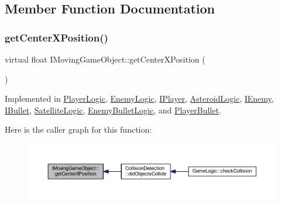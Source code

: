 \subsection{Member Function Documentation}
\mbox{\label{class_i_moving_game_object_ae4e6c21094ef1e2db32729270c8a7999}} 
\subsubsection{\texorpdfstring{get\+Center\+X\+Position()}{getCenterXPosition()}}
{\footnotesize\ttfamily virtual float I\+Moving\+Game\+Object\+::get\+Center\+X\+Position (\begin{DoxyParamCaption}{ }\end{DoxyParamCaption})\hspace{0.3cm}{\ttfamily [pure virtual]}}



Implemented in \hyperlink{class_player_logic_a6bdec8d007701c16a3cbb87e7fdfe0e6}{Player\+Logic}, \hyperlink{class_enemy_logic_a1429e91a81da7646d9b0280f26519d8c}{Enemy\+Logic}, \hyperlink{class_i_player_a10d652f5066f96f3526242448de3a6e2}{I\+Player}, \hyperlink{class_asteroid_logic_a4bff0373a2cefe48c984b469ddbcb52d}{Asteroid\+Logic}, \hyperlink{class_i_enemy_ab5bc39484a8aeaf278c3d127ec5d9545}{I\+Enemy}, \hyperlink{class_i_bullet_a43a43e2df81e05a03be42d9025e6dd2a}{I\+Bullet}, \hyperlink{class_satellite_logic_aa6e4c41fc34adaf4ef7861a6a3785226}{Satellite\+Logic}, \hyperlink{class_enemy_bullet_logic_a39ffa8b7fabb84625a859691099652de}{Enemy\+Bullet\+Logic}, and \hyperlink{class_player_bullet_a73c27dca47ea3fdcecd82ce4b2089c4a}{Player\+Bullet}.

Here is the caller graph for this function\+:
\nopagebreak
\begin{figure}[H]
\begin{center}
\leavevmode
\includegraphics[width=350pt]{class_i_moving_game_object_ae4e6c21094ef1e2db32729270c8a7999_icgraph}
\end{center}
\end{figure}
\mbox{\label{class_i_moving_game_object_a075f69d69fd38dc02a0ec3c7b1cb0534}} 
